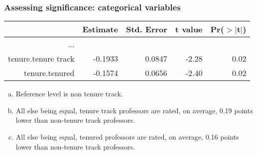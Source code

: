 \begin{frame}[fragile]
\frametitle{Assessing significance: categorical variables}


{\footnotesize
\begin{center}
\begin{tabular}{rrrrr}
  \hline
 & Estimate & Std. Error & t value & Pr($>$$|$t$|$) \\ 
  \hline
... \\
  tenure.tenure track & -0.1933 & 0.0847 & -2.28 & 0.02 \\ 
  tenure.tenured & -0.1574 & 0.0656 & -2.40 & 0.02 \\ 
   \hline
\end{tabular}
\end{center}
}

\begin{enumerate}[(a)]
\item Reference level is non tenure track.
\item All else being equal, tenure track professors are rated, on average, 0.19 points lower than non-tenure track professors.
\item All else being equal, tenured professors are rated, on average, 0.16 points lower than non-tenure track professors.
\end{enumerate}

\end{frame}


